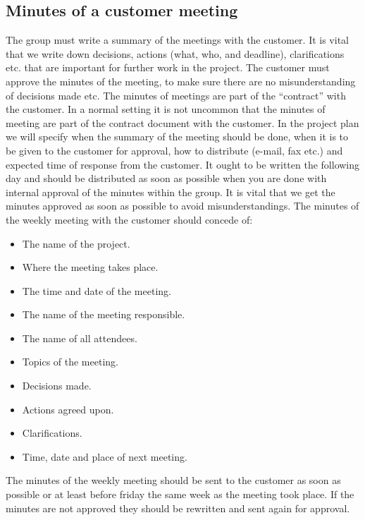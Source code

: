 \subsection{Minutes of a customer meeting}
The group must write a summary of the meetings with the customer. It is vital that we write down decisions, actions (what, who, and deadline), clarifications etc. that are important for further work in the project. The customer must approve the minutes of the meeting, to make sure there are no misunderstanding of decisions made etc. The minutes of meetings are part of the “contract” with the customer. In a normal setting it is not uncommon that the minutes of meeting are part of the contract document with the customer.
\newline
\newline
In the project plan we will specify when the summary of the meeting should be done, when it is to be given to the customer for approval, how to distribute (e-mail, fax etc.) and expected time of response from the customer. It ought to be written the following day and should be distributed as soon as possible when you are done with internal approval of the minutes within the group. It is vital that we get the minutes approved as soon as possible to avoid misunderstandings.
\newline
\newline
The minutes of the weekly meeting with the customer should concede of:
\begin{itemize}
\item{}The name of the project.
\item{}Where the meeting takes place.
\item{}The time and date of the meeting.
\item{}The name of the meeting responsible.
\item{}The name of all attendees.
\item{}Topics of the meeting.
\item{}Decisions made.
\item{}Actions agreed upon.
\item{}Clarifications.
\item{}Time, date and place of next meeting.
\end{itemize}

The minutes of the weekly meeting should be sent to the customer as soon as possible or at least before friday the same week as the meeting took place. If the minutes are not approved they should be rewritten and sent again for approval. 


